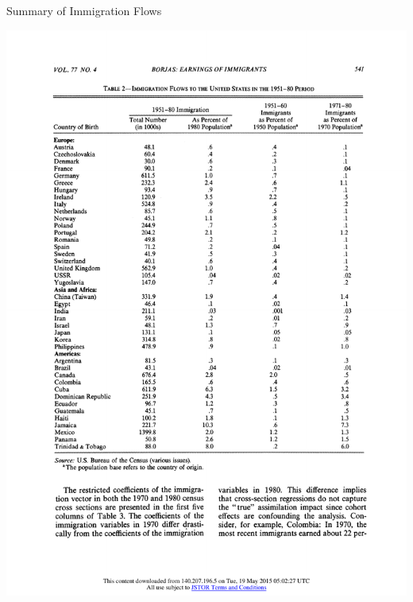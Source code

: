 \documentclass[10pt]{beamer}
\begin{document}
\begin{frame}[t]{Summary of Immigration Flows}

\centerline{\includegraphics[height=0.9\textheight]{ImmigrationFlow.pdf}}

\end{frame}
\end{document}
